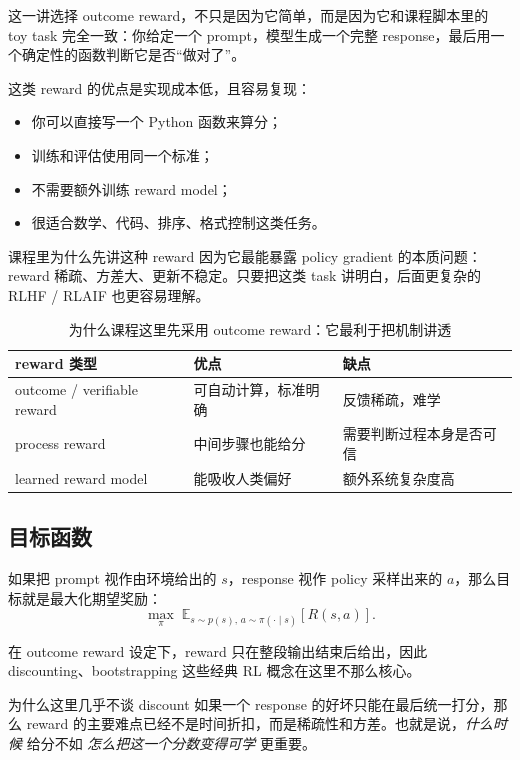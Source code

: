这一讲选择 outcome reward，不只是因为它简单，而是因为它和课程脚本里的 toy task 完全一致：你给定一个 prompt，模型生成一个完整 response，最后用一个确定性的函数判断它是否“做对了”。

这类 reward 的优点是实现成本低，且容易复现：
\begin{itemize}
    \item 你可以直接写一个 Python 函数来算分；
    \item 训练和评估使用同一个标准；
    \item 不需要额外训练 reward model；
    \item 很适合数学、代码、排序、格式控制这类任务。
\end{itemize}

\begin{importantbox}{课程里为什么先讲这种 reward}
因为它最能暴露 policy gradient 的本质问题：reward 稀疏、方差大、更新不稳定。只要把这类 task 讲明白，后面更复杂的 RLHF / RLAIF 也更容易理解。
\end{importantbox}

\begin{table}[H]
\centering
\begin{tabular}{@{}p{3.1cm}p{4.4cm}p{5.0cm}@{}}
\toprule
\textbf{reward 类型} & \textbf{优点} & \textbf{缺点} \\
\midrule
outcome / verifiable reward & 可自动计算，标准明确 & 反馈稀疏，难学 \\
process reward & 中间步骤也能给分 & 需要判断过程本身是否可信 \\
learned reward model & 能吸收人类偏好 & 额外系统复杂度高 \\
\bottomrule
\end{tabular}
\caption{为什么课程这里先采用 outcome reward：它最利于把机制讲透}
\end{table}

\subsection{目标函数}

如果把 prompt 视作由环境给出的 $s$，response 视作 policy 采样出来的 $a$，那么目标就是最大化期望奖励：
\[
\max_\pi \; \mathbb{E}_{s \sim p(s),\, a \sim \pi(\cdot \mid s)}[R(s,a)].
\]

在 outcome reward 设定下，reward 只在整段输出结束后给出，因此 discounting、bootstrapping 这些经典 RL 概念在这里不那么核心。

\begin{knowledgebox}{为什么这里几乎不谈 discount}
如果一个 response 的好坏只能在最后统一打分，那么 reward 的主要难点已经不是时间折扣，而是稀疏性和方差。也就是说，\emph{什么时候} 给分不如 \emph{怎么把这一个分数变得可学} 更重要。
\end{knowledgebox}


